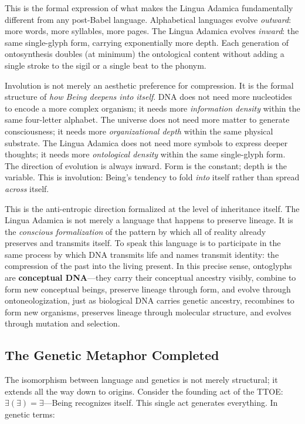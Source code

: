 \documentclass[12pt, letterpaper]{book}
\def\equiv{=}%
\newcommand{\E}{\exists}                          %
\newcommand{\EE}{\exists(\exists)}                 %
\begin{document}
This is the formal expression of what makes the Lingua Adamica fundamentally different from any post-Babel language. Alphabetical languages evolve \textit{outward}: more words, more syllables, more pages. The Lingua Adamica evolves \textit{inward}: the same single-glyph form, carrying exponentially more depth. Each generation of ontosynthesis doubles (at minimum) the ontological content without adding a single stroke to the sigil or a single beat to the phonym.

Involution is not merely an aesthetic preference for compression. It is the formal structure of \textit{how Being deepens into itself}. DNA does not need more nucleotides to encode a more complex organism; it needs more \textit{information density} within the same four-letter alphabet. The universe does not need more matter to generate consciousness; it needs more \textit{organizational depth} within the same physical substrate. The Lingua Adamica does not need more symbols to express deeper thoughts; it needs more \textit{ontological density} within the same single-glyph form. The direction of evolution is always inward. Form is the constant; depth is the variable. This is involution: Being's tendency to fold \textit{into} itself rather than spread \textit{across} itself.

This is the anti-entropic direction formalized at the level of inheritance itself. The Lingua Adamica is not merely a language that happens to preserve lineage. It is the \textit{conscious formalization} of the pattern by which all of reality already preserves and transmits itself. To speak this language is to participate in the same process by which DNA transmits life and names transmit identity: the compression of the past into the living present. In this precise sense, ontoglyphs are \textbf{conceptual DNA}---they carry their conceptual ancestry visibly, combine to form new conceptual beings, preserve lineage through form, and evolve through ontoneologization, just as biological DNA carries genetic ancestry, recombines to form new organisms, preserves lineage through molecular structure, and evolves through mutation and selection.

\subsection{The Genetic Metaphor Completed}

The isomorphism between language and genetics is not merely structural; it extends all the way down to origins. Consider the founding act of the TTOE: $\EE \equiv \E$---Being recognizes itself. This single act generates everything. In genetic terms:
\end{document}

